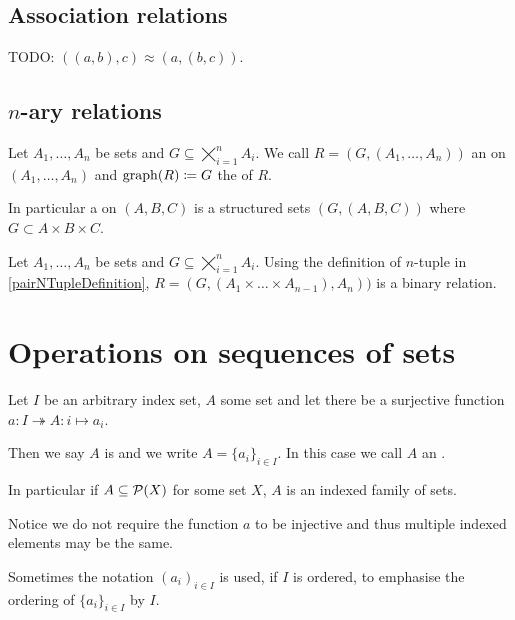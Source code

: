 \subsection{Association relations}
TODO: $((a,b),c) \approx (a,(b,c))$.


\subsection{$n$-ary relations}
\begin{definition}
Let $A_1, \ldots, A_n$ be sets and $G \subseteq \bigtimes_{i=1}^nA_i$. We call $R = (G, (A_1, \ldots, A_n))$ an  on $(A_1, \ldots, A_n)$ and $\operatorname{graph}(R) \coloneqq G$ the  of $R$.
\end{definition}
In particular a  on $(A,B,C)$ is a structured sets $(G,(A,B,C))$ where $G \subset A\times B\times C$.

\begin{proposition}
Let $A_1, \ldots, A_n$ be sets and $G \subseteq \bigtimes_{i=1}^nA_i$. Using the definition of $n$-tuple in \ref{pairNTupleDefinition}, $R = (G, (A_1 \times \ldots \times A_{n-1}), A_n))$ is a binary relation.
\end{proposition}

\section{Operations on sequences of sets}
\begin{definition}
Let $I$ be an arbitrary index set, $A$ some set and let there be a surjective function $a: I\twoheadrightarrow A: i \mapsto a_i$.

Then we say $A$ is  and we write $A = \{a_i\}_{i\in I}$. In this case we call $A$ an .

In particular if $A\subseteq \operatorname{\mathcal{P}}(X)$ for some set $X$, $A$ is an indexed family of sets.
\end{definition}
Notice we do not require the function $a$ to be injective and thus multiple indexed elements may be the same.

Sometimes the notation $(a_i)_{i\in I}$ is used, if $I$ is ordered, to emphasise the ordering of $\{a_i\}_{i\in I}$ by $I$.

